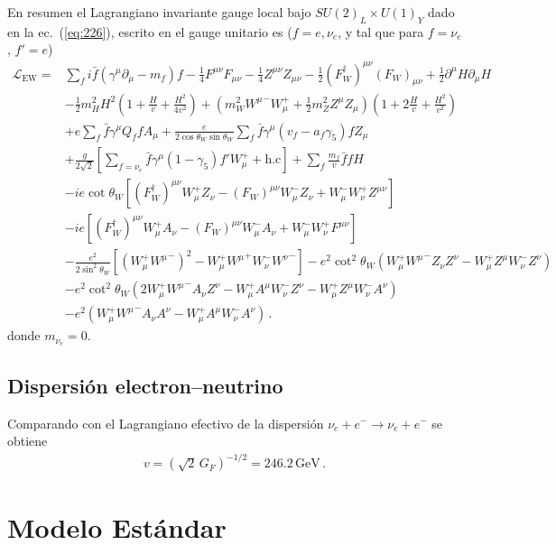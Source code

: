 En resumen el Lagrangiano invariante gauge local bajo $SU(2)_L\times U(1)_Y$ dado en la ec.~(\ref{eq:226}), escrito en el gauge unitario es ($f=e,\nu_e$, y tal que para $f=\nu_e$, $f'=e$)
\begin{align}
\mathcal{L}_{\text{EW}}=&\sum_f i\bar{f}\left(\gamma^\mu\partial_\mu-m_f\right)f
-\tfrac{1}{4}F^{\mu\nu} F_{\mu\nu}-\tfrac{1}{4}Z^{\mu\nu} Z_{\mu\nu}-\tfrac{1}{2}(F_W^\dagger)^{\mu\nu} (F_W)_{\mu\nu}
+\tfrac{1}{2}\partial^\mu H\partial_\mu H\nonumber\\
&-\frac{1}{2}m_H^2H^2\left(1+\frac{H}{v}+\frac{H^2}{4v^2}\right)
+\left(m_W^2{W^\mu}^-W_\mu^++\frac{1}{2}m_Z^2Z^\mu Z_\mu\right)\left(1+2\frac{H}{v}+\frac{H^2}{v^2}\right)\nonumber\\
&+e\sum_f \bar{f}\gamma^\mu Q_f f A_\mu+\frac{e}{2\cos\theta_W\sin\theta_W}\sum_{f}\bar{f}\gamma^\mu(v_f-a_f\gamma_5)f Z_\mu\nonumber\\
&+\frac{g}{2\sqrt{2}}\left[\sum_{f=\nu_e}\bar{f}\gamma^\mu(1-\gamma_5)f' W_\mu^++\text{h.c}\right]
+\sum_f \frac{m_f}{v} \bar{f}f H\nonumber\\
&-ie\cot\theta_W\left[(F_W^\dagger)^{\mu\nu}W_\mu^+ Z_\nu-(F_W)^{\mu\nu}W_\mu^- Z_\nu+W_\mu^-W_\nu^+Z^{\mu\nu}\right]\nonumber\\
&-ie\left[(F_W^\dagger)^{\mu\nu}W_\mu^+ A_\nu-(F_W)^{\mu\nu}W_\mu^- A_\nu+W_\mu^-W_\nu^+F^{\mu\nu}\right]\nonumber\\
&-\frac{e^2}{2\sin^2\theta_W}\left[\left(W_\mu^+{W^\mu}^-\right)^2-W_\mu^+{W^\mu}^+W_\nu^-{W^\nu}^-\right]
-e^2\cot^2\theta_W\left(W_\mu^+{W^\mu}^-Z_\nu Z^\nu-W_\mu^+Z^\mu W_\nu^-Z^\nu\right)\nonumber\\
&-e^2\cot^2\theta_W\left(2W_\mu^+{W^\mu}^-A_\nu Z^\nu-W_\mu^+A^\mu W_\nu^-Z^\nu-W_\mu^+Z^\mu W_\nu^-A^\nu\right)\nonumber\\
&-e^2\left(W_\mu^+{W^\mu}^-A_\nu A^\nu-W_\mu^+A^\mu W_\nu^-A^\nu\right)\,.
\end{align}
donde $m_{\nu_e}=0$.

\subsection{Dispersi\'on electron--neutrino}
\label{sec:disp-electr-neutr}
Comparando con el Lagrangiano efectivo de la dispersi\'on $\nu_e + e^- \to \nu_e + e^-$ se obtiene
\begin{align}
  v=\left(\sqrt{2}\,G_F\right)^{-1/2}=246.2\,\text{GeV}\,.
\end{align}


\section{Modelo Est\'andar}
\label{sec:modelo-estandar-1}

